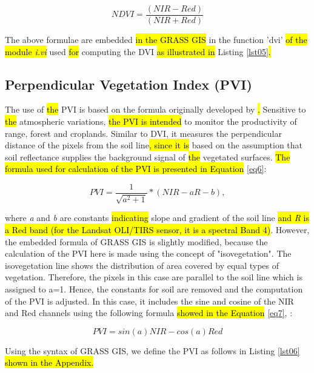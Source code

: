 \documentclass[jmse,article,submit,pdftex,moreauthors]{Definitions/mdpi}
\begin{document}
\begin{equation}\label{eq5}
	NDVI = \frac{(NIR - Red)}{(NIR + Red)}
\end{equation}

The above formulae are embedded \hl{in the GRASS GIS }in the function 'dvi' \hl{of the module \emph{i.vi} }used \hl{for} computing the DVI\hl{ as illustrated in} Listing \ref{lst05}\hl{.}

\subsection{Perpendicular Vegetation Index (PVI)}

The use of \hl{the }PVI is based on the formula originally developed by \cite{Richardson}\hl{. }Sensitive to \hl{the }atmospheric variations, \hl{the PVI is intended }to monitor the productivity of range, forest\hl{ }and croplands. Similar to\hl{ }DVI, it\hl{ }measures the perpendicular distance of the pixels from the soil line\hl{, since it is }based on the assumption that soil reflectance supplies the background signal of \hl{the }vegetated surfaces. \hl{The formula used for calculation of the PVI is presented in Equation} \ref{eq6}:

\begin{equation}\label{eq6}
	PVI=\frac{1}{\sqrt{a^2+1}} * (NIR - aR - b),
\end{equation} 

where \emph{a} and \emph{b} are\hl{ }constants \hl{indicating} slope and gradient of the soil line \hl{and \emph{R} is a Red band (for the Landsat OLI/TIRS sensor, it is a spectral Band 4)}. However, the embedded formula of GRASS GIS is slightly modified, because the calculation of the PVI here is made using the concept of "isovegetation". The isovegetation line shows the distribution of area covered by equal types of vegetation. Therefore, the pixels in this case are parallel to the soil line which is assigned to a=1. Hence, the constants for soil are removed and the computation of the PVI is adjusted. In this case, it includes the sine and cosine of the NIR and Red channels using the following formula \hl{showed in the Equation} \ref{eq7}, \cite{PERRY1984169}:

\begin{equation}\label{eq7}
	PVI = sin(a)NIR-cos(a)Red
\end{equation} 

Using the syntax of GRASS GIS, we define the PVI as follows in Listing \ref{lst06}\hl{ shown in the Appendix.}
\end{document}
